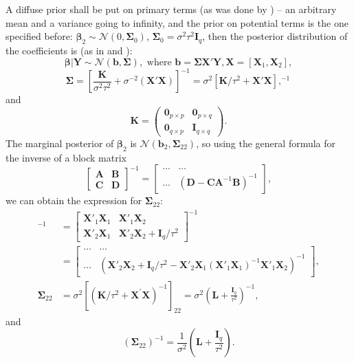 A diffuse prior shall be put on primary terms (as was done by \cite{DuMouchel1994}) -- an arbitrary mean and a variance going to infinity, and the prior on potential terms is the one specified before: $\bm{\beta}_2\sim\mathcal{N}(0,\bm{\Sigma}_{0})$,
$\bm{\Sigma}_{0}=\sigma^{2}\tau^{2}\bm{I}_{q}$, then the posterior
distribution of the coefficients is (as in \cite{Koch2007introduction} and \cite{DuMouchel1994}):
$$\bm{\beta}|\bm{Y}\sim \mathcal{N}(\bm{b},\bm{\Sigma}),\mbox{ where }\bm{b}=\bm{\Sigma X}'\bm{Y}, \bm{X}=[\bm{X}_1, \bm{X}_2],$$
$$\bm{\Sigma}=\left[\frac{\bm{K}}{\sigma^{2}\tau^{2}}+\sigma^{-2}(\bm{X'X})\right]^{-1}=\sigma^{2}[\bm{K}/\tau^{2}+\bm{X'}\bm{X}],^{-1}$$
and 
\begin{equation*}
\bm{K}=\begin{pmatrix}
\bm{0}_{p\times p} & \bm{0}_{p\times q}\\
\bm{0}_{q\times p} & \bm{I}_{q\times q}
\end{pmatrix}.
\end{equation*}
The marginal posterior of $\bm{\beta}_2$ is $\mathcal{N}(\bm{b}_{2},\bm{\Sigma}_{22})$, so using the general formula for the inverse of a block matrix
$$\begin{bmatrix}
 \bm{A}& \bm{B}\\
 \bm{C}& \bm{D}
\end{bmatrix}^{-1}=\begin{bmatrix}
\ldots & \ldots\\
\ldots & (\bm{D}-\bm{CA}^{-1}\bm{B})^{-1}
\end{bmatrix},$$
we can obtain the expression for $\bm{\Sigma}_{22}$:
\begin{align*}
[\bm{K}/\tau^{2}+\bm{X}'\bm{X}]^{-1}&=\begin{bmatrix}
 \bm{X}'_1\bm{X}_1& \bm{X}'_1\bm{X}_2 \\
 \bm{X}'_2\bm{X}_1& \bm{X}'_2\bm{X}_2+\bm{I}_{q}/\tau^{2}
\end{bmatrix}^{-1}\\&=\begin{bmatrix}
\ldots & \ldots\\
\ldots &
(\bm{X}'_2\bm{X}_2+\bm{I}_{q}/\tau^{2}-\bm{X}'_2\bm{X}_1(\bm{X}'_1\bm{X}_1)^{-1}\bm{X}'_1\bm{X}_2)^{-1}
\end{bmatrix},\\
\bm{\Sigma}_{22}&=\sigma^{2}[(\bm{K}/\tau^{2}+\bm{X}^{'}\bm{X})^{-1}]_{22}=\sigma^{2}\left(\bm{L}+\frac{\bm{I}_{q}}{\tau^{2}}\right)^{-1},
\end{align*} 
and $$(\bm{\Sigma}_{22})^{-1}=\frac{1}{\sigma^{2}}\left(\bm{L}+\frac{\bm{I}_{q}}{\tau^{2}}\right).$$

